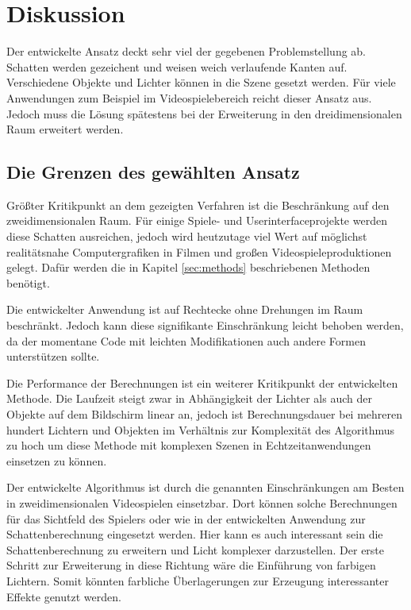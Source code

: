\section{Diskussion}

Der entwickelte Ansatz deckt sehr viel der gegebenen Problemstellung ab. Schatten werden gezeichent und weisen weich verlaufende Kanten auf. Verschiedene Objekte und Lichter können in die Szene gesetzt werden. Für viele Anwendungen zum Beispiel im Videospielebereich reicht dieser Ansatz aus. Jedoch muss die Lösung spätestens bei der Erweiterung in den dreidimensionalen Raum erweitert werden.

\subsection{Die Grenzen des gewählten Ansatz}

Größter Kritikpunkt an dem gezeigten Verfahren ist die Beschränkung auf den zweidimensionalen Raum. Für einige Spiele- und Userinterfaceprojekte werden diese Schatten ausreichen, jedoch wird heutzutage viel Wert auf möglichst realitätsnahe Computergrafiken in Filmen und großen Videospieleproduktionen gelegt. Dafür werden die in Kapitel \ref{sec:methods} beschriebenen Methoden benötigt.

Die entwickelter Anwendung ist auf Rechtecke ohne Drehungen im Raum beschränkt. Jedoch kann diese signifikante Einschränkung leicht behoben werden, da der momentane Code mit leichten Modifikationen auch andere Formen unterstützen sollte.

Die Performance der Berechnungen ist ein weiterer Kritikpunkt der entwickelten Methode. Die Laufzeit steigt zwar in Abhängigkeit der Lichter als auch der Objekte auf dem Bildschirm linear an, jedoch ist Berechnungsdauer bei mehreren hundert Lichtern und Objekten im Verhältnis zur Komplexität des Algorithmus zu hoch um diese Methode mit komplexen Szenen in Echtzeitanwendungen einsetzen zu können. 

Der entwickelte Algorithmus ist durch die genannten Einschränkungen am Besten in zweidimensionalen Videospielen einsetzbar. Dort können solche Berechnungen für das Sichtfeld des Spielers oder wie in der entwickelten Anwendung zur Schattenberechnung eingesetzt werden. Hier kann es auch interessant sein die Schattenberechnung zu erweitern und Licht komplexer darzustellen. Der erste Schritt zur Erweiterung in diese Richtung wäre die Einführung von farbigen Lichtern. Somit könnten farbliche Überlagerungen zur Erzeugung interessanter Effekte genutzt werden.

